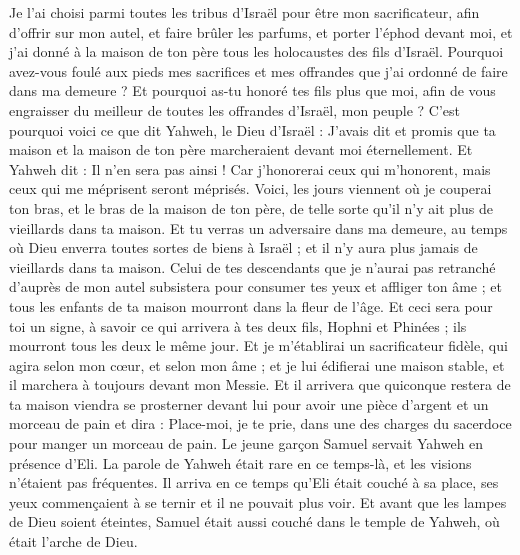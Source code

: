 \begin{multicols}{2}
Je l'ai choisi parmi toutes les tribus d'Israël pour être mon sacrificateur, afin d'offrir sur mon autel, et faire brûler les parfums, et porter l'éphod devant moi, et j'ai donné à la maison de ton père tous les holocaustes des fils d'Israël.
Pourquoi avez-vous foulé aux pieds mes sacrifices et mes offrandes que j'ai ordonné de faire dans ma demeure ? Et pourquoi as-tu honoré tes fils plus que moi, afin de vous engraisser du meilleur de toutes les offrandes d'Israël, mon peuple ?
C'est pourquoi voici ce que dit Yahweh, le Dieu d'Israël : J'avais dit et promis que ta maison et la maison de ton père marcheraient devant moi éternellement. Et Yahweh dit : Il n'en sera pas ainsi ! Car j'honorerai ceux qui m'honorent, mais ceux qui me méprisent seront méprisés.
Voici, les jours viennent où je couperai ton bras, et le bras de la maison de ton père, de telle sorte qu'il n'y ait plus de vieillards dans ta maison.
Et tu verras un adversaire dans ma demeure, au temps où Dieu enverra toutes sortes de biens à Israël ; et il n'y aura plus jamais de vieillards dans ta maison.
Celui de tes descendants que je n'aurai pas retranché d'auprès de mon autel subsistera pour consumer tes yeux et affliger ton âme ; et tous les enfants de ta maison mourront dans la fleur de l'âge.
Et ceci sera pour toi un signe, à savoir ce qui arrivera à tes deux fils, Hophni et Phinées ; ils mourront tous les deux le même jour.
Et je m'établirai un sacrificateur fidèle, qui agira selon mon cœur, et selon mon âme ; et je lui édifierai une maison stable, et il marchera à toujours devant mon Messie.
Et il arrivera que quiconque restera de ta maison viendra se prosterner devant lui pour avoir une pièce d'argent et un morceau de pain et dira : Place-moi, je te prie, dans une des charges du sacerdoce pour manger un morceau de pain.
\VerseOne{}Le jeune garçon Samuel servait Yahweh en présence d'Eli. La parole de Yahweh était rare en ce temps-là, et les visions n'étaient pas fréquentes.
Il arriva en ce temps qu'Eli était couché à sa place, ses yeux commençaient à se ternir et il ne pouvait plus voir.
Et avant que les lampes de Dieu soient éteintes, Samuel était aussi couché dans le temple de Yahweh, où était l'arche de Dieu.

\end{multicols}
